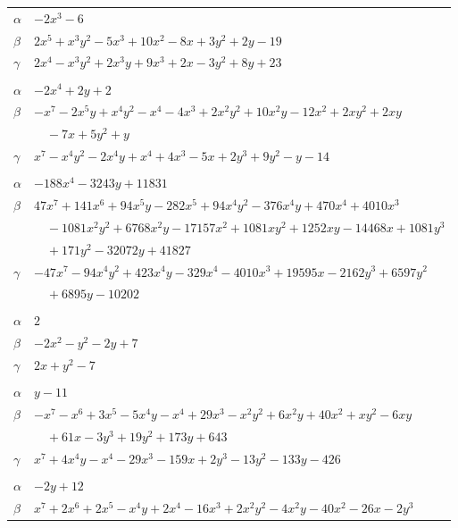 \documentclass[11pt]{article}
\begin{document}
\begin{longtable}{@{}ll@{}}
$\alpha$ & $-2x^{3}-6$\\
$\beta$ & $2x^{5}+x^{3}y^{2}-5x^{3}+10x^{2}-8x+3y^{2}+2y-19$\\
$\gamma$ & $2x^{4}-x^{3}y^{2}+2x^{3}y+9x^{3}+2x-3y^{2}+8y+23$\\
\addlinespace[3pt]
\multicolumn{2}{@{}l}{$\{i,j\}=\{26,30\}$, $k_{ij}=2^{2}\cdot 3$}\\
$\alpha$ & $-2x^{4}+2y+2$\\
$\beta$ & $-x^{7}-2x^{5}y+x^{4}y^{2}-x^{4}-4x^{3}+2x^{2}y^{2}+10x^{2}y-12x^{2}+2xy^{2}+2xy$\\
 & $\quad -7x+5y^{2}+y$\\
$\gamma$ & $x^{7}-x^{4}y^{2}-2x^{4}y+x^{4}+4x^{3}-5x+2y^{3}+9y^{2}-y-14$\\
\addlinespace[3pt]
\multicolumn{2}{@{}l}{$\{i,j\}=\{27,29\}$, $k_{ij}=2^{5}\cdot 3^{2}\cdot 5^{2}\cdot 7$}\\
$\alpha$ & $-188x^{4}-3243y+11831$\\
$\beta$ & $47x^{7}+141x^{6}+94x^{5}y-282x^{5}+94x^{4}y^{2}-376x^{4}y+470x^{4}+4010x^{3}$\\
 & $\quad -1081x^{2}y^{2}+6768x^{2}y-17157x^{2}+1081xy^{2}+1252xy-14468x+1081y^{3}$\\
 & $\quad +171y^{2}-32072y+41827$\\
$\gamma$ & $-47x^{7}-94x^{4}y^{2}+423x^{4}y-329x^{4}-4010x^{3}+19595x-2162y^{3}+6597y^{2}$\\
 & $\quad +6895y-10202$\\
\addlinespace[3pt]
\multicolumn{2}{@{}l}{$\{i,j\}=\{27,30\}$, $k_{ij}=2^{2}\cdot 3$}\\
$\alpha$ & $2$\\
$\beta$ & $-2x^{2}-y^{2}-2y+7$\\
$\gamma$ & $2x+y^{2}-7$\\
\addlinespace[3pt]
\multicolumn{2}{@{}l}{$\{i,j\}=\{27,35\}$, $k_{ij}=2^{3}\cdot 3^{3}\cdot 5$}\\
$\alpha$ & $y-11$\\
$\beta$ & $-x^{7}-x^{6}+3x^{5}-5x^{4}y-x^{4}+29x^{3}-x^{2}y^{2}+6x^{2}y+40x^{2}+xy^{2}-6xy$\\
 & $\quad +61x-3y^{3}+19y^{2}+173y+643$\\
$\gamma$ & $x^{7}+4x^{4}y-x^{4}-29x^{3}-159x+2y^{3}-13y^{2}-133y-426$\\
\addlinespace[3pt]
\multicolumn{2}{@{}l}{$\{i,j\}=\{29,32\}$, $k_{ij}=2^{2}\cdot 3\cdot 5$}\\
$\alpha$ & $-2y+12$\\
$\beta$ & $x^{7}+2x^{6}+2x^{5}-x^{4}y+2x^{4}-16x^{3}+2x^{2}y^{2}-4x^{2}y-40x^{2}-26x-2y^{3}$\\

\end{longtable}
\end{document}
